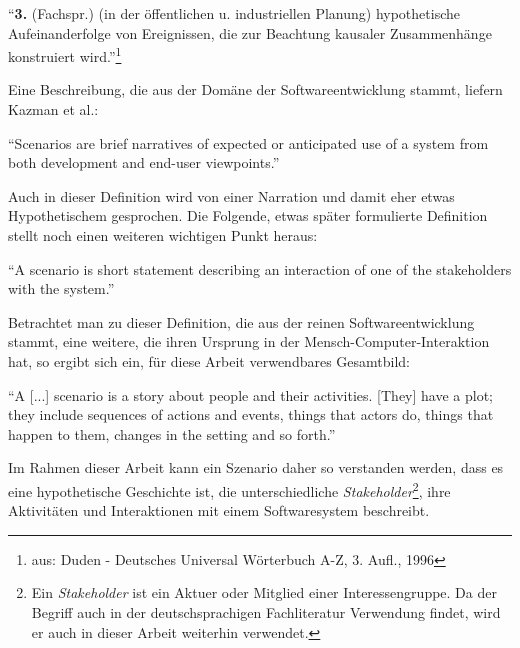   \begin{definition}\label{def:szenario_allg}
    "`\textbf{3.} (Fachspr.) (in der öffentlichen u. industriellen Planung) hypothetische Aufeinanderfolge von Ereignissen, die zur Beachtung kausaler Zusammenhänge konstruiert wird."'\footnote{aus: Duden - Deutsches Universal Wörterbuch A-Z, 3. Aufl., 1996}
  \end{definition}
  
  Eine Beschreibung, die aus der Domäne der Softwareentwicklung stammt, liefern Kazman et al.:
  
  \begin{definition}\label{def:szenario_kazman_et_al}
    "`Scenarios are brief narratives of expected or anticipated use of a system from both development and end-user viewpoints."'~\emph{\citep[S. 2]{scenario_based_analysis_of_software_architecture}}
  \end{definition}
  
  Auch in dieser Definition wird von einer Narration und damit eher etwas Hypothetischem gesprochen. Die Folgende, etwas später formulierte Definition stellt noch einen weiteren wichtigen Punkt heraus:
  
  \begin{definition}\label{def:szenario_clements_et_al}
    "`A scenario is short statement describing an interaction of one of the stakeholders with the system."'~\emph{\citep[S. 33]{evaluating_software_architectures}}
  \end{definition}
  
  Betrachtet man zu dieser Definition, die aus der reinen Softwareentwicklung stammt, eine weitere, die ihren Ursprung in der Mensch-Computer-Interaktion hat, so ergibt sich ein, für diese Arbeit verwendbares Gesamtbild:
  
  \begin{definition}\label{def:szenario_carroll_rosson}
    "`A [...] scenario is a story about people and their activities. [They] have a plot; they include sequences of actions and events, things that actors do, things that happen to them, changes in the setting and so forth."'~\emph{\citep[S. 16/18]{scenario_based_development}}
  \end{definition}
  
  Im Rahmen dieser Arbeit kann ein Szenario daher so verstanden werden, dass es eine hypothetische Geschichte ist, die unterschiedliche \emph{Stakeholder}\footnote{Ein \emph{Stakeholder} ist ein Aktuer oder Mitglied einer Interessengruppe. Da der Begriff auch in der deutschsprachigen Fachliteratur Verwendung findet, wird er auch in dieser Arbeit weiterhin verwendet.}, ihre Aktivitäten und Interaktionen mit einem Softwaresystem beschreibt.
  
